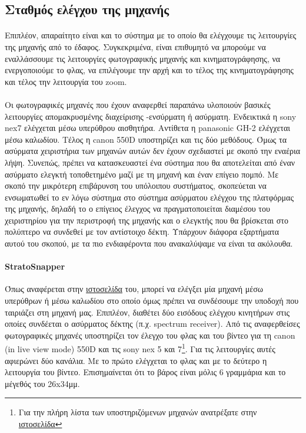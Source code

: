 \documentclass[a4paper, 12pt, twoside]{report}
\begin{document}
{{{{{{		\subsection{Σταθμός ελέγχου της μηχανής}	
			\paragraph{}{Επιπλέον, απαραίτητο είναι και το σύστημα με το οποίο θα ελέγχουμε τις λειτουργίες της μηχανής από το έδαφος. Συγκεκριμένα, είναι επιθυμητό να μπορούμε να εναλλάσσουμε τις λειτουργίες φωτογραφικής μηχανής και κινηματογράφησης, να ενεργοποιούμε το φλας, να επιλέγουμε την αρχή και το τέλος της κινηματογράφησης και τέλος την λειτουργία του zoom.
			}
			\paragraph{}{Οι φωτογραφικές μηχανές που έχουν αναφερθεί παραπάνω υλοποιούν βασικές λειτουργίες απομακρυσμένης διαχείρισης -ενσύρματη ή ασύρματη. Ενδεικτικά η sony nex7 ελέγχεται μέσω υπερύθρου αισθητήρα. Αντίθετα η panasonic GH-2 ελέγχεται μέσω καλωδίου. Τέλος η canon 550D υποστηρίζει και τις δύο μεθόδους. Όμως τα ασύρματα χειριστήρια των μηχανών αυτών δεν έχουν σχεδιαστεί με σκοπό την εναέρια λήψη. Συνεπώς, πρέπει να κατασκευαστεί ένα σύστημα που θα αποτελείται από έναν ασύρματο ελεγκτή τοποθετημένο μαζί με τη μηχανή και έναν επίγειο πομπό. Με σκοπό την μικρότερη επιβάρυνση του υπόλοιπου συστήματος, σκοπεύεται να ενσωματωθεί το εν λόγω σύστημα στο σύστημα ασύρματου ελέγχου της πλατφόρμας της μηχανής, δηλαδή το ο επίγειος έλεγχος να πραγματοποιείται διαμέσου του χειριστηρίου για την περιστροφή της μηχανής και ο ελεγκτής που θα βρίσκεται στο πολύπτερο να συνδεθεί με τον αντίστοιχο δέκτη. Υπάρχουν διάφορα εξαρτήματα αυτού του σκοπού, με τα πιο ενδιαφέροντα που ανακαλύψαμε να είναι τα ακόλουθα.
			}
			\paragraph{StratoSnapper}{Όπως αναφέρεται στην \href{http://littlesmartthings.com/stratosnapper/}{ιστοσελίδα} του, μπορεί να ελέγξει μία μηχανή μέσω υπερύθρων ή μέσω καλωδίου στο οποίο όμως πρέπει να συνδέσουμε την υποδοχή που ταιριάζει στη μηχανή μας. Επιπλέον, διαθέτει δύο εισόδους ελέγχου κινητήρων στις οποίες συνδέεται ο ασύρματος δέκτης (π.χ. spectrum receiver). Από τις αναφερθείσες φωτογραφικές μηχανές υποστηρίζει τον έλεγχο του φλας και του βίντεο για τη canon (in live view mode) 550D και τις sony nex 5 και 7\footnote{Για την πλήρη λίστα των υποστηριζόμενων μηχανών ανατρέξατε στην \href{http://littlesmartthings.com/stratosnapper-supported-cameras/}{ιστοσελίδα}}. Για τις λειτουργίες αυτές αφιερώνει δύο κανάλια. Με το πρώτο ελέγχεται το φλας και με το δεύτερο η λειτουργία του βίντεο. Επισημαίνεται ότι το βάρος είναι μόλις 6 γραμμάρια και το μέγεθός του 26x34μμ.
			}
}}}}}}
\end{document}
